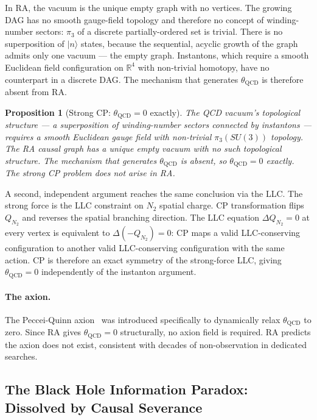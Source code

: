 \documentclass[11pt,a4paper]{article}
\newtheorem{proposition}[theorem]{Proposition}
\begin{document}
In RA, the vacuum is the unique empty graph with no vertices.
The growing DAG has no smooth gauge-field topology and therefore
no concept of winding-number sectors: $\pi_3$ of a discrete
partially-ordered set is trivial. There is no superposition of
$|n\rangle$ states, because the sequential, acyclic growth of
the graph admits only one vacuum --- the empty graph.
Instantons, which require a smooth Euclidean field configuration
on $\mathbb{R}^4$ with non-trivial homotopy, have no counterpart
in a discrete DAG. The mechanism that generates $\theta_{\mathrm{QCD}}$
is therefore absent from RA.

\begin{proposition}[Strong CP: $\theta_{\mathrm{QCD}} = 0$ exactly]
\label{prop:strong_cp}
The QCD vacuum's topological structure --- a superposition of winding-number
sectors connected by instantons --- requires a smooth Euclidean gauge field
with non-trivial $\pi_3(SU(3))$ topology. The RA causal graph has a unique
empty vacuum with no such topological structure. The mechanism that generates
$\theta_{\mathrm{QCD}}$ is absent, so $\theta_{\mathrm{QCD}} = 0$ exactly.
The strong CP problem does not arise in RA.
\end{proposition}

A second, independent argument reaches the same conclusion via the
LLC. The strong force is the LLC constraint on $N_2$ spatial charge.
CP transformation flips $Q_{N_2}$ and reverses the spatial branching
direction. The LLC equation $\Delta Q_{N_2} = 0$ at every vertex is
equivalent to $\Delta(-Q_{N_2}) = 0$: CP maps a valid LLC-conserving
configuration to another valid LLC-conserving configuration with the
same action. CP is therefore an exact symmetry of the strong-force LLC,
giving $\theta_{\mathrm{QCD}} = 0$ independently of the instanton argument.

\paragraph{The axion.}
The Peccei-Quinn axion~\citep{Peccei1977} was introduced specifically
to dynamically relax $\theta_{\mathrm{QCD}}$ to zero. Since RA gives
$\theta_{\mathrm{QCD}} = 0$ structurally, no axion field is required.
RA predicts the axion does not exist, consistent with decades of
non-observation in dedicated searches.

\subsection{The Black Hole Information Paradox: Dissolved by Causal Severance}
\label{sec:bh_info}
\end{document}
